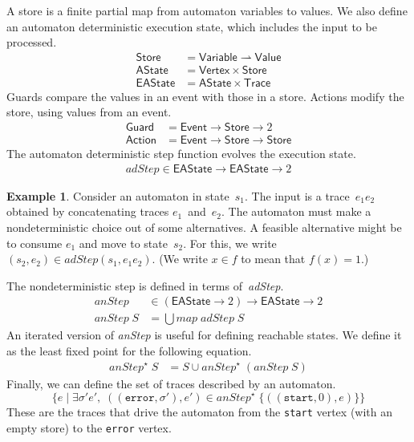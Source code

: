 \documentclass[preprint]{sigplanconf} %
\newcommand{\pmap}{\rightharpoonup}
\newcommand{\set}[1]{\ensuremath{\mathsf{#1}}}
\theoremstyle{definition}
\newtheorem{example}{Example}
\theoremstyle{remark}
\begin{document}
A store is a finite partial map from automaton variables to values.
We also define an automaton deterministic execution state, which includes the input to be processed.
\begin{align}
\set{Store}&=\set{Variable}\pmap\set{Value} \\
\set{AState}&=\set{Vertex}\times\set{Store} \label{eq:astate} \\
\set{EAState}&=\set{AState}\times\set{Trace} \label{eq:eastate}
\end{align}
Guards compare the values in an event with those in a store.
Actions modify the store, using values from an event.
\begin{align}
\set{Guard}&=\set{Event}\to\set{Store}\to2 \\
\set{Action}&=\set{Event}\to\set{Store}\to\set{Store}
\end{align}
The automaton deterministic step function evolves the execution state.
\begin{align}
\mathit{adStep}\in\set{EAState}\to\set{EAState}\to2 \label{eq:adstep}
\end{align}
\begin{example}
Consider an automaton in state~$s_1$.
The input is a trace~$e_1e_2$ obtained by concatenating traces $e_1$~and~$e_2$.
The automaton must make a nondeterministic choice out of some alternatives.
A feasible alternative might be to consume $e_1$ and move to state~$s_2$.
For this, we write $(s_2,e_2)\in\mathit{adStep}(s_1,e_1e_2)$.
(We write $x\in f$ to mean that $f(x)=1$.)
\end{example}
The nondeterministic step is defined in terms of~\textit{adStep}.
\begin{align}
\mathit{anStep}&\in(\set{EAState}\to2)\to\set{EAState}\to2\\
\mathit{anStep}\;S&=\bigcup \mathit{map}\;\mathit{adStep}\;S \label{eq:anstep}
\end{align}
An iterated version of \textit{anStep} is useful for defining reachable states.
We define it as the least fixed point for the following equation.
\begin{align}
\mathit{anStep}^\star\;S &= S \cup \mathit{anStep}^\star\;(\mathit{anStep}\;S)
\end{align}
Finally, we can define the set of traces described by an automaton.
\[ \{ e \mid \exists\sigma'e',\;((\mathtt{error},\sigma'),e')\in\mathit{anStep}^\star\;\{((\mathtt{start},0),e)\}\} \]
These are the traces that drive the automaton from the \texttt{start} vertex (with an empty store) to the \texttt{error} vertex.
\end{document}
